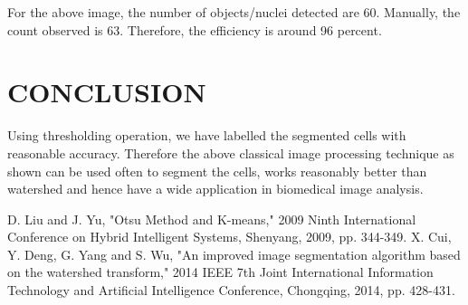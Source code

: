 \documentclass[letterpaper, 10 pt, conference]{ieeeconf}
\begin{document}



For the above image, the number of objects/nuclei detected are 60. Manually, the count observed is 63. Therefore, the efficiency is around 96 percent.

\section{CONCLUSION}
Using thresholding operation, we have labelled the segmented cells with reasonable accuracy. Therefore the above classical image processing technique as shown can be used often to segment the cells, works reasonably better than watershed and hence have a wide application in biomedical image analysis.


\begin{thebibliography}{99}

 D. Liu and J. Yu, "Otsu Method and K-means," 2009 Ninth International Conference on Hybrid Intelligent Systems, Shenyang, 2009, pp. 344-349.
 X. Cui, Y. Deng, G. Yang and S. Wu, "An improved image segmentation algorithm based on the watershed transform," 2014 IEEE 7th Joint International Information Technology and Artificial Intelligence Conference, Chongqing, 2014, pp. 428-431.

\end{thebibliography}
\end{document}
